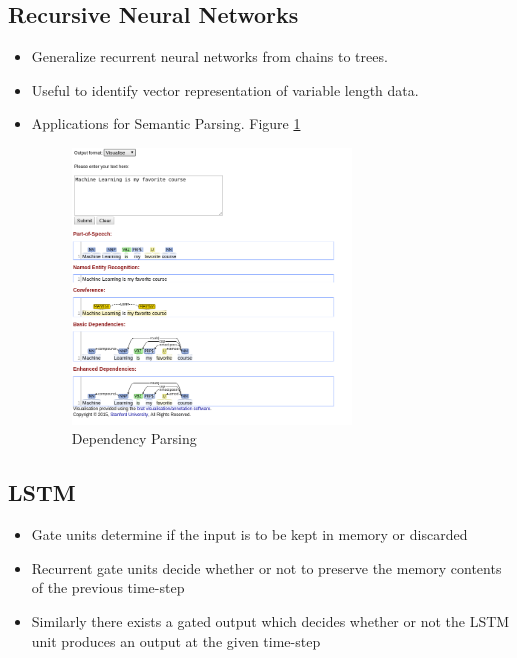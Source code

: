 \documentclass[parskip=half]{scrartcl}
\begin{document}

    \subsection{Recursive Neural Networks} %
    \label{sub:recursive_neural_networks}

        \begin{itemize}
            \item 
            Generalize recurrent neural networks from chains to trees.
            \item 
            Useful to identify vector representation of variable length data.
            \item 
            Applications for Semantic Parsing. Figure \ref{fig:dependency-parser}
            \begin{figure}[ht]
                \centering
                \includegraphics[width=0.7\textwidth]{dependency-parser}
                \caption{Dependency Parsing}
                \label{fig:dependency-parser}
            \end{figure}
        \end{itemize}
    

    \subsection{LSTM} %
    \label{sub:lstm}

        \begin{itemize}
            \item 
            Gate units determine if the input is to be kept in memory or discarded
            \item 
            Recurrent gate units decide whether or not to preserve the memory contents of the previous time-step
            \item 
            Similarly there exists a gated output which decides whether or not the LSTM unit produces an output at the given time-step
        \end{itemize}
    
\end{document}
